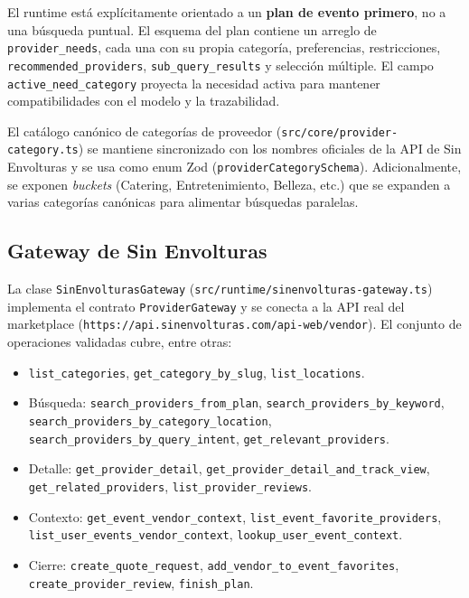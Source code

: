 \documentclass[11pt,a4paper]{article}
\begin{document}
El runtime está explícitamente orientado a un \textbf{plan de evento
primero}, no a una búsqueda puntual. El esquema del plan contiene un
arreglo de \texttt{provider\_needs}, cada una con su propia categoría,
preferencias, restricciones, \texttt{recommended\_providers},
\texttt{sub\_query\_results} y selección múltiple. El campo
\texttt{active\_need\_category} proyecta la necesidad activa para
mantener compatibilidades con el modelo y la trazabilidad.

El catálogo canónico de categorías de proveedor
(\texttt{src/core/provider-category.ts}) se mantiene sincronizado con
los nombres oficiales de la API de Sin Envolturas y se usa como enum Zod
(\texttt{providerCategorySchema}). Adicionalmente, se exponen
\emph{buckets} (Catering, Entretenimiento, Belleza, etc.) que se
expanden a varias categorías canónicas para alimentar búsquedas
paralelas.

\subsection{Gateway de Sin Envolturas}

La clase \texttt{SinEnvolturasGateway}
(\texttt{src/runtime/sinenvolturas-gateway.ts}) implementa el contrato
\texttt{ProviderGateway} y se conecta a la API real del marketplace
(\texttt{https://api.sinenvolturas.com/api-web/vendor}). El conjunto de
operaciones validadas cubre, entre otras:

\begin{itemize}[leftmargin=*,itemsep=1pt]
  \item \texttt{list\_categories}, \texttt{get\_category\_by\_slug},
        \texttt{list\_locations}.
  \item Búsqueda: \texttt{search\_providers\_from\_plan},
        \texttt{search\_providers\_by\_keyword},
        \texttt{search\_providers\_by\_category\_location},
        \texttt{search\_providers\_by\_query\_intent},
        \texttt{get\_relevant\_providers}.
  \item Detalle: \texttt{get\_provider\_detail},
        \texttt{get\_provider\_detail\_and\_track\_view},
        \texttt{get\_related\_providers},
        \texttt{list\_provider\_reviews}.
  \item Contexto: \texttt{get\_event\_vendor\_context},
        \texttt{list\_event\_favorite\_providers},
        \texttt{list\_user\_events\_vendor\_context},
        \texttt{lookup\_user\_event\_context}.
  \item Cierre: \texttt{create\_quote\_request},
        \texttt{add\_vendor\_to\_event\_favorites},
        \texttt{create\_provider\_review},
        \texttt{finish\_plan}.
\end{itemize}
\end{document}
